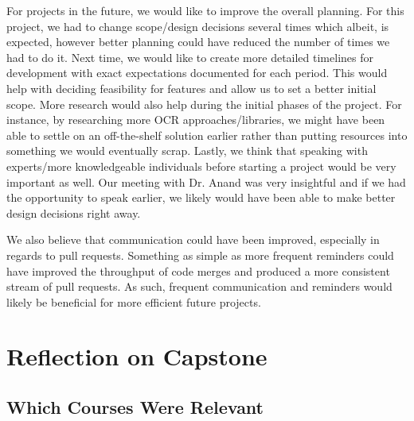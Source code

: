 \documentclass{article}
\begin{document}
For projects in the future, we would like to improve the overall planning. For this project, we had to change scope/design decisions several
times which albeit, is expected, however better planning could have reduced the number of
times we had to do it. Next time, we would like to create more detailed timelines for development with exact
expectations documented for each period. This would help with deciding feasibility for features and allow us
to set a better initial scope. More research would also help during the initial phases of the project.
For instance, by researching more OCR approaches/libraries, we might have been able to settle on an off-the-shelf solution
earlier rather than putting resources into something we would eventually scrap. Lastly, we think that speaking with experts/more
knowledgeable individuals before starting a project would be very important as well. Our meeting with Dr. Anand was very insightful
and if we had the opportunity to speak earlier, we likely would have been able to make better design decisions right away.

We also believe that communication could have been improved, especially in regards to pull requests.
Something as simple as more frequent reminders could have improved the throughput of code merges and produced a more
consistent stream of pull requests. As such, frequent communication and reminders would likely be beneficial for more efficient future
projects.

\section{Reflection on Capstone}


\subsection{Which Courses Were Relevant}

\end{document}
